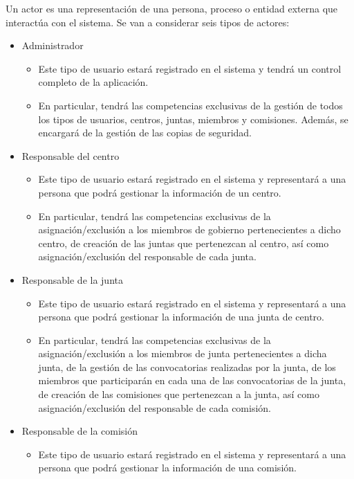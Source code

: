 Un actor es una representación de una persona, proceso o entidad externa que interactúa con el sistema. Se van a considerar seis tipos de actores:
    \begin{itemize}
        \item Administrador
          \begin{itemize}
              \item Este tipo de usuario estará registrado en el sistema y tendrá un control completo de la aplicación. 
              \item En particular, tendrá las competencias exclusivas de la gestión de todos los tipos de usuarios, centros, juntas, miembros y comisiones. Además, se encargará de la gestión de las copias de seguridad.
          \end{itemize}
          \item Responsable del centro
           \begin{itemize}
               \item Este tipo de usuario estará registrado en el sistema y representará a una persona que podrá gestionar la información de un centro.
               \item En particular, tendrá las competencias exclusivas de la asignación/exclusión a los miembros de gobierno pertenecientes a dicho centro, de creación de las juntas que pertenezcan al centro, así como asignación/exclusión del responsable de cada junta.
            \end{itemize}
            \item Responsable de la junta
           \begin{itemize}
               \item Este tipo de usuario estará registrado en el sistema y representará a una persona que podrá gestionar la información de una junta de centro.
               \item En particular, tendrá las competencias exclusivas de la asignación/exclusión a los miembros de junta pertenecientes a dicha junta, de la gestión de las convocatorias realizadas por la junta, de los miembros que participarán en cada una de las convocatorias de la junta, de creación de las comisiones que pertenezcan a la junta, así como asignación/exclusión del responsable de cada comisión.
            \end{itemize}
          \item Responsable de la comisión 
           \begin{itemize}
               \item Este tipo de usuario estará registrado en el sistema y representará a una persona que podrá gestionar la información de una comisión.

\end{itemize}
\end{itemize}
